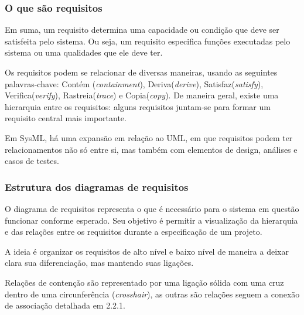 
\subsubsection{O que são requisitos}

Em suma, um requisito determina uma capacidade ou condição que deve ser satisfeita pelo sistema. Ou seja, um requisito especifica funções executadas pelo sistema ou uma qualidades que ele deve ter.

Os requisitos podem se relacionar de diversas maneiras, usando as seguintes palavras-chave:  Contém (\textit{containment}), Deriva(\textit{derive}), Satisfaz(\textit{satisfy}), Verifica(\textit{verify}), Rastreia(\textit{trace}) e Copia(\textit{copy}). De maneira geral, existe uma hierarquia entre os requisitos: alguns requisitos juntam-se para formar um requisito central mais importante.

Em SysML, há uma expansão em relação ao UML, em que requisitos podem ter relacionamentos não só entre si, mas também com elementos de design, análises e casos de testes. 


\subsubsection{Estrutura dos diagramas de requisitos}
O diagrama de requisitos representa o que é necessário para o sistema em questão funcionar conforme esperado. Seu objetivo é permitir a visualização da hierarquia e das relações entre os requisitos durante a especificação de um projeto. 

A ideia é organizar os requisitos de alto nível e baixo nível de maneira a deixar clara sua diferenciação, mas mantendo suas ligações. 

 Relações de contenção são representado por uma ligação sólida com uma cruz dentro de uma circunferência (\textit{crosshair}), as outras são relações seguem a conexão de associação detalhada em 2.2.1.

